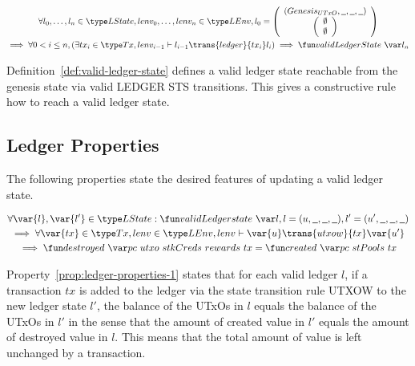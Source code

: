 \begin{definition}
  \begin{multline*}
    \forall l_{0},\ldots,l_{n} \in \LState, lenv_{0},\ldots,lenv_{n} \in \LEnv,
    l_{0} = \left(
      \begin{array}{c}
        \genesisUTxOState \\
        \left(
        \begin{array}{c}
          \emptyset\\
          \emptyset
        \end{array}
        \right)
      \end{array}
    \right)  \\
    \implies \forall 0 < i \leq n, (\exists tx_{i} \in \Tx,
    lenv_{i-1}\vdash l_{i-1} \trans{ledger}{tx_{i}} l_{i}) \implies
    \applyFun{validLedgerState} l_{n}
  \end{multline*}
  \label{def:valid-ledger-state}
\end{definition}

Definition~\ref{def:valid-ledger-state} defines a valid ledger state reachable
from the genesis state via valid LEDGER STS transitions. This gives a
constructive rule how to reach a valid ledger state.

\subsection{Ledger Properties}
\label{sec:ledger-properties}

The following properties state the desired features of updating a valid ledger
state.

\begin{property}
  \begin{multline*}
    \forall \var{l}, \var{l'} \in \LState: \applyFun{validLedgerstate}{l},
    l=(u,\wcard,\wcard,\wcard), l' = (u',\wcard,\wcard,\wcard)\\
    \implies \forall \var{tx} \in \Tx, lenv \in\LEnv, lenv \vdash\var{u} \trans{utxow}{tx} \var{u'} \\
    \implies \applyFun{destroyed}{pc~utxo~stkCreds~rewards~tx} =
    \applyFun{created}{pc~stPools~tx}
  \end{multline*}
  \label{prop:ledger-properties-1}
\end{property}

Property~\ref{prop:ledger-properties-1} states that for each valid ledger $l$,
if a transaction $tx$ is added to the ledger via the state transition rule UTXOW
to the new ledger state $l'$, the balance of the UTxOs in $l$ equals the balance
of the UTxOs in $l'$ in the sense that the amount of created value in $l'$
equals the amount of destroyed value in $l$. This means that the total amount of
value is left unchanged by a transaction.

